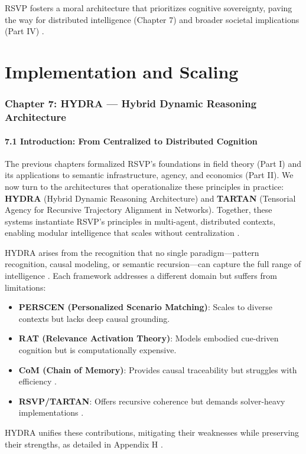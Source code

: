 \documentclass[12pt]{article}
\begin{document}
{RSVP fosters a moral architecture that prioritizes cognitive sovereignty, paving the way for distributed intelligence (Chapter 7) and broader societal implications (Part IV) \citep{whitehead1978, deleuze1987}.

\part{Implementation and Scaling}

\section*{Chapter 7: HYDRA --- Hybrid Dynamic Reasoning Architecture}

\subsection*{7.1 Introduction: From Centralized to Distributed Cognition}

The previous chapters formalized RSVP’s foundations in field theory (Part I) and its applications to semantic infrastructure, agency, and economics (Part II). We now turn to the architectures that operationalize these principles in practice: \textbf{HYDRA} (Hybrid Dynamic Reasoning Architecture) and \textbf{TARTAN} (Tensorial Agency for Recursive Trajectory Alignment in Networks). Together, these systems instantiate RSVP’s principles in multi-agent, distributed contexts, enabling modular intelligence that scales without centralization \citep{bird1988, milewski2018}.

HYDRA arises from the recognition that no single paradigm—pattern recognition, causal modeling, or semantic recursion—can capture the full range of intelligence \citep{pearl2009}. Each framework addresses a different domain but suffers from limitations:
\begin{itemize}
    \item \textbf{PERSCEN (Personalized Scenario Matching)}: Scales to diverse contexts but lacks deep causal grounding.
    \item \textbf{RAT (Relevance Activation Theory)}: Models embodied cue-driven cognition but is computationally expensive.
    \item \textbf{CoM (Chain of Memory)}: Provides causal traceability but struggles with efficiency \citep{pearl2009}.
    \item \textbf{RSVP/TARTAN}: Offers recursive coherence but demands solver-heavy implementations \citep{milewski2018}.
\end{itemize}
HYDRA unifies these contributions, mitigating their weaknesses while preserving their strengths, as detailed in Appendix H \citep{friston2010, hohwy2013}.

}
\end{document}
